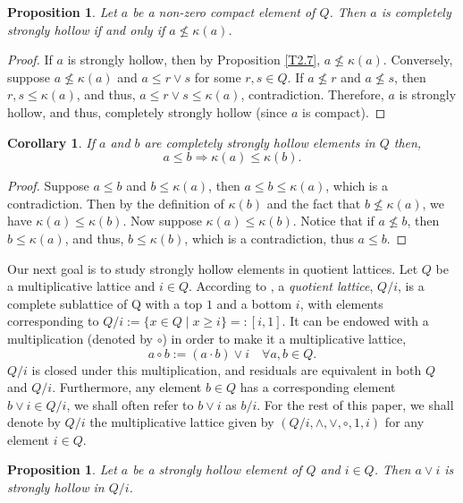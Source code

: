\documentclass[11pt,english]{amsart}
\newtheorem{proposition}[theorem]{Proposition}
\newtheorem{corollary}[theorem]{Corollary}
\theoremstyle{definition}
\numberwithin{equation}{section}
\theoremstyle{remark}
\def\leq{\leqslant}
\begin{document}
	\begin{proposition}
		Let $a$ be a non-zero compact element of $Q$. Then $a$ is completely strongly hollow if and only if $a \nleq \kappa(a)$.
	\end{proposition}
	
	\begin{proof}
		If $a$ is strongly hollow, then by Proposition \ref{T2.7}, $a\nleq\kappa(a)$.
		Conversely, suppose $a \nleq \kappa(a)$ and $a \leq r \vee s$ for some $r, s \in Q$. If $a \nleq r$ and $a \nleq s$, then $r, s \leq \kappa(a)$, and thus, $a \leq r \vee s \leq \kappa(a)$, contradiction. Therefore, $a$ is strongly hollow, and thus, completely strongly hollow (since $a$ is compact).
	\end{proof}
	
	\begin{corollary}
		If $a$ and $b$  are completely strongly hollow elements in $Q$ then, \[ a\leq b \Rightarrow \kappa(a)\leq\kappa(b).\]
	\end{corollary}
	
	\begin{proof}
		Suppose $a\leq b$ and $b\leq\kappa(a)$, then $a\leq b\leq \kappa(a)$, which is a contradiction. Then by the definition of $\kappa(b)$ and the fact that $b\nleq \kappa(a)$, we have  $\kappa(a)\leq\kappa(b)$. Now suppose $\kappa(a)\leq\kappa(b)$. Notice that if $a\nleq b$, then $b\leq \kappa(a)$, and thus, $b\leq \kappa(b)$, which is a contradiction, thus $a\leq b$.
	\end{proof}
	
	Our next goal is to study strongly hollow elements in quotient lattices.    Let $Q$ be a multiplicative lattice and $i\in Q$. According to \cite{Dil62}, a \emph{quotient lattice}, $Q/i$, is a complete sublattice of Q with a top $1$ and a bottom $i$, with elements corresponding to $Q/i:=\{x\in Q\mid x\geqslant i\}=:[i,1]$. It can be endowed with a multiplication (denoted by $\circ$) in order to make it a multiplicative lattice, \[a \circ b := (a\cdot b)\vee i \quad \forall a,b\in Q.\]
	$Q/i$ is closed under this multiplication, and residuals are equivalent in both $Q$ and $Q/i$. Furthermore, any element $b\in Q$ has a corresponding element $b\vee i \in Q/i$, we shall often refer to $b\vee i$ as $b/i$.
	For the rest of this paper, we shall denote by $Q/i$ the multiplicative lattice given by $(Q/i,\wedge, \vee,\circ, 1, i)$ for any element $i\in Q$.
	
	\begin{proposition}
		Let $a$ be a strongly hollow element of $Q$ and $i\in Q$. Then $a\vee i$ is strongly hollow in $Q/i$.
	\end{proposition}
	
\end{document}

